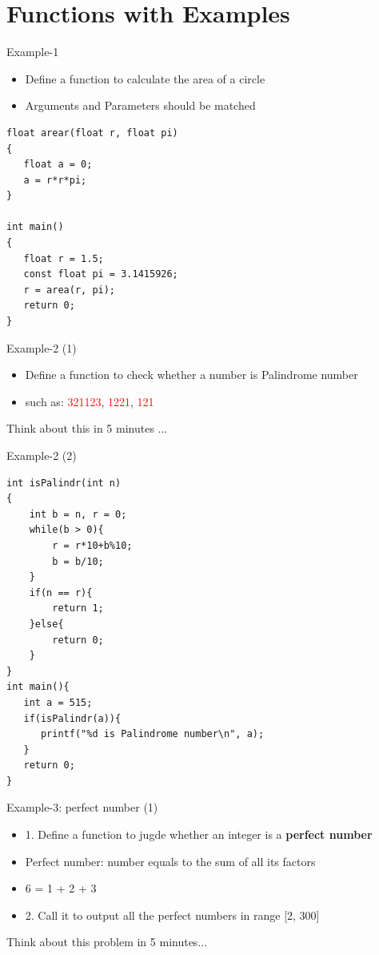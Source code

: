 \section{Functions with Examples}
\label{sec:example}
\begin{frame}[fragile]{Example-1}
\begin{itemize}
	\item {Define a function to calculate the area of a circle}
	\item {Arguments and Parameters should be matched}
\end{itemize}
\begin{lstlisting}
float arear(float r, float pi)
{
   float a = 0;
   a = r*r*pi;
}

int main()
{
   float r = 1.5;
   const float pi = 3.1415926;
   r = area(r, pi);
   return 0;
}
\end{lstlisting}
\end{frame}

\begin{frame}[fragile]{Example-2 (1)}
\begin{itemize}
	\item {Define a function to check whether a number is Palindrome number}
	\item {such as: \textcolor{red}{321123}, \textcolor{red}{1221}, \textcolor{red}{121}}
\end{itemize}
\begin{center}
	\Large{
	Think about this in 5 minutes ...
	}
\end{center}
\end{frame}

\begin{frame}[fragile]{Example-2 (2)}
\begin{lstlisting}
int isPalindr(int n)
{
    int b = n, r = 0;
    while(b > 0){
        r = r*10+b%10;
        b = b/10;
    }
    if(n == r){
        return 1;
    }else{
        return 0;
    }
}
int main(){
   int a = 515;
   if(isPalindr(a)){
      printf("%d is Palindrome number\n", a);
   }
   return 0;
}
\end{lstlisting}
\end{frame}



\begin{frame}[fragile]{Example-3: perfect number (1)}
\begin{itemize}
	\item {1. Define a function to jugde whether an integer is a \textbf{perfect number}}
	\item {Perfect number: number equals to the sum of all its factors}
	\item {6 = 1 + 2 + 3}
	\item {2. Call it to output all the perfect numbers in range [2, 300]}
\end{itemize}
\begin{center}
	\Large{Think about this problem in 5 minutes...}
\end{center}
\end{frame}

